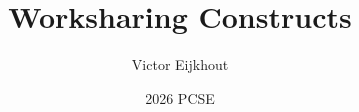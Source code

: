 \documentclass[10pt]{beamer}
\begin{document}
\author[Eijkhout]{Victor Eijkhout}
\date[2026]{2026 PCSE}
\title[workshare]{Worksharing Constructs}
\maketitle


\end{document}

